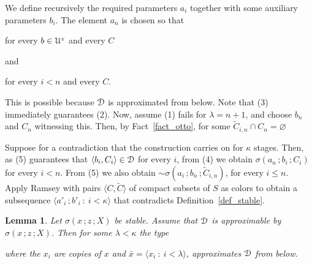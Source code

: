 \documentclass{amsproc}
\makeatletter
\newcounter{thm}
\theoremstyle{mio}
\newtheorem{lemma}[thm]{Lemma}\tcolorboxenvironment{lemma}{mythm}
\providecommand{\proofNameStyle}{\bfseries}
\renewenvironment{proof}[1][\proofname]{\par
  \pushQED{\qed}%
  \normalfont%
  \trivlist
  \item[\hskip\labelsep
        \proofNameStyle
    #1\@addpunct{.}]\ignorespaces
}{%
  \popQED\endtrivlist\@endpefalse
}
\makeatother
\begin{document}
\begin{proof}
  We define recursively the required parameters $a_i$ together with some auxiliary parameters $b_i$.
  The element $a_n$ is chosen so that

\hfill for every $b\in{\EuScript U}^z$ and every $C$

and

\hfill for every $i<n$ and every $C$.\smallskip

This is possible because ${\EuScript D}$ is approximated from below.
Note that (3) immediately guarantees (2).
Now, assume (1) fails for $\lambda=n+1$, and choose $b_n$ and $C_n$ witnessing this.
Then, by Fact~\ref{fact_otto}, for some $\tilde C_{i,n}\cap C_n=\varnothing$


Suppose for a contradiction that the construction carries on for $\kappa$ stages.
Then, as (5) guarantees that $\langle b_i,C_i\rangle\in{\EuScript D}$ for every $i$, from (4) we obtain $\sigma(a_n\,;b_i\,;C_i)$ for every $i<n$.
From (5) we also obtain ${\sim}\sigma(a_i\,;b_n\,;\tilde C_{i,n})$, for every $i\le n$.
Apply Ramsey with pairs $\langle C,\tilde C\rangle$ of compact subsets of $S$ as colors to obtain a subsequence $\langle a'_i\,;b'_i\ :\ i<\kappa\rangle$ that contradicts Definition~\ref{def_stable}.
\end{proof}

\begin{lemma}
  Let $\sigma(x\,;z\,;X)$ be stable.
  Assume that ${\EuScript D}$ is approximable by $\sigma(x\,;z\,;X)$.
  Then for some $\lambda<\kappa$ the type\medskip 

  \smallskip
  
  where the $x_i$ are copies of $x$ and $\bar x=\langle x_i\ :\ i<\lambda\rangle$,
  approximates ${\EuScript D}$ from below.
\end{lemma}
\end{document}
